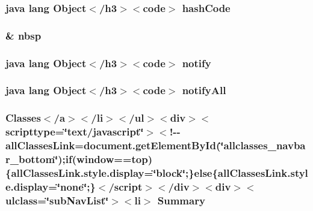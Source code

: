 \hypertarget{_sensor_measure_8html_a8e178e2bb2bef055ea23ea3910a221ca}{
\subsubsection[{hash\-Code}]{\setlength{\rightskip}{0pt plus 5cm}java lang Object$<$/h3$>$$<$code$>$ hash\-Code}}\label{_sensor_measure_8html_a8e178e2bb2bef055ea23ea3910a221ca}
\hypertarget{_sensor_measure_8html_aef915316f784c9063d942974538301a6}{
\subsubsection[{nbsp}]{\setlength{\rightskip}{0pt plus 5cm}\& nbsp}}\label{_sensor_measure_8html_aef915316f784c9063d942974538301a6}
\hypertarget{_sensor_measure_8html_ae99ae10b5010594dbda4794e02db271b}{
\subsubsection[{notify}]{\setlength{\rightskip}{0pt plus 5cm}java lang Object$<$/h3$>$$<$code$>$ notify}}\label{_sensor_measure_8html_ae99ae10b5010594dbda4794e02db271b}
\hypertarget{_sensor_measure_8html_a1279357e6e09e33e75b55eb05fdb6436}{
\subsubsection[{notify\-All}]{\setlength{\rightskip}{0pt plus 5cm}java lang Object$<$/h3$>$$<$code$>$ notify\-All}}\label{_sensor_measure_8html_a1279357e6e09e33e75b55eb05fdb6436}
\hypertarget{_sensor_measure_8html_a6f9ab45abc9b0679dc1b132fbacfc681}{
\subsubsection[{Summary}]{\setlength{\rightskip}{0pt plus 5cm}Classes$<$/{\bf a}$>$$<$/li$>$$<$/ul$>$$<$div$>$$<$scripttype=\char`\"{}text/javascript\char`\"{}$>$$<$!-\/-\/all\-Classes\-Link=document.\-get\-Element\-By\-Id(\char`\"{}allclasses\-\_\-navbar\-\_\-bottom\char`\"{});if(window==top)\{all\-Classes\-Link.\-style.\-display=\char`\"{}block\char`\"{};\}else\{all\-Classes\-Link.\-style.\-display=\char`\"{}none\char`\"{};\}$<$/script$>$$<$/div$>$$<$div$>$$<$ulclass=\char`\"{}sub\-Nav\-List\char`\"{}$>$$<$li$>$ Summary}}\label{_sensor_measure_8html_a6f9ab45abc9b0679dc1b132fbacfc681}
